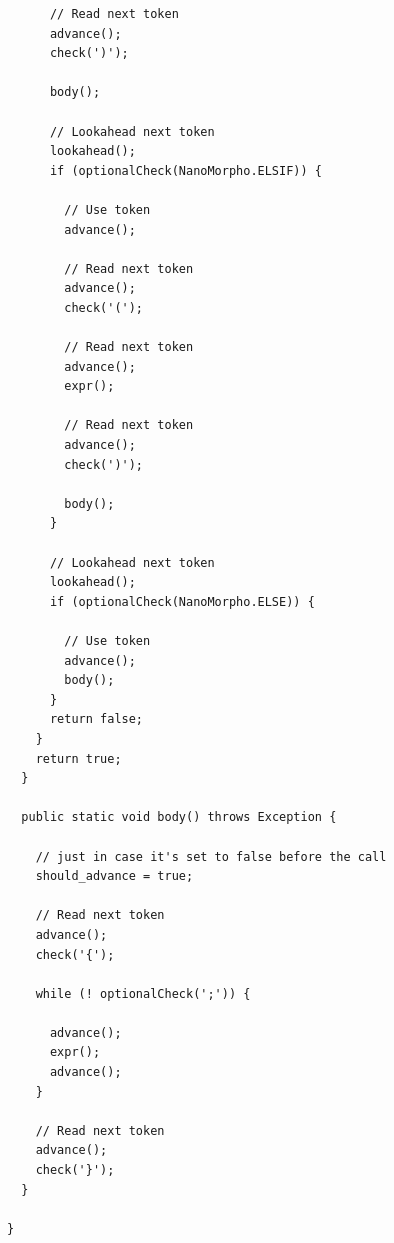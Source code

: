 \documentclass{homework}
\begin{document}
\begin{answer}
\begin{verbatim}
      // Read next token
      advance();
      check(')');

      body();

      // Lookahead next token
      lookahead();
      if (optionalCheck(NanoMorpho.ELSIF)) {

        // Use token
        advance();

        // Read next token
        advance();
        check('(');

        // Read next token
        advance();
        expr();

        // Read next token
        advance();
        check(')');

        body();
      }
      
      // Lookahead next token
      lookahead();
      if (optionalCheck(NanoMorpho.ELSE)) {

        // Use token
        advance();
        body();
      }
      return false;
    }
    return true;
  }

  public static void body() throws Exception {    
    
    // just in case it's set to false before the call
    should_advance = true;

    // Read next token
    advance();
    check('{');

    while (! optionalCheck(';')) {

      advance();
      expr();
      advance();
    }

    // Read next token
    advance();
    check('}');
  }

}
\end{verbatim}
\end{answer}

\newpage
\end{document}
